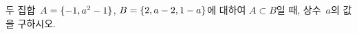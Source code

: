 두 집합~$A=\{-1{,}\mkern3mu\mathopen{}a^2-1\}$, $B=\{2{,}\mkern3mu\mathopen{}a-2{,}\mkern3mu\mathopen{}1-a\}$에 대하여 $A\subset B$일 때, 상수~$a$의 값을 구하시오.
